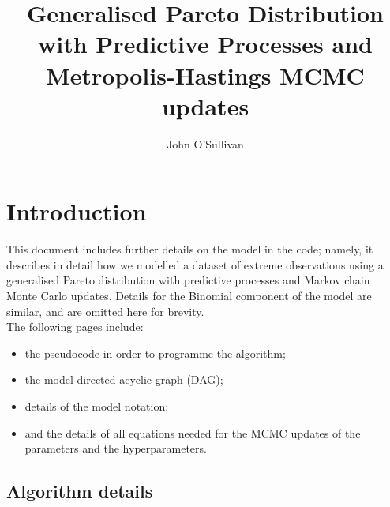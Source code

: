 \documentclass{article}
\begin{document}
\title{Generalised Pareto Distribution with Predictive Processes and Metropolis-Hastings MCMC updates}
\author{John O'Sullivan}
\maketitle

\section*{Introduction} %
This document includes further details on the model in the code; namely, it describes in detail how we modelled a dataset of extreme observations using a generalised Pareto distribution with predictive processes and Markov chain Monte Carlo updates. Details for the Binomial component of the model are similar, and are omitted here for brevity.
\\

The following pages include:
\begin{itemize}
\itemsep-0.4em
\item the pseudocode in order to programme the algorithm;
\item the model directed acyclic graph (DAG);
\item details of the model notation;
\item and the details of all equations needed for the MCMC updates of the parameters and the hyperparameters.
\end{itemize}

\subsection*{Algorithm details}

\end{document}
